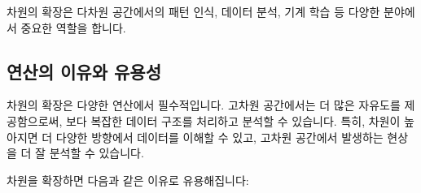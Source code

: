 \vspace{1\baselineskip}
\noindent 차원의 확장은 다차원 공간에서의 패턴 인식, 데이터 분석, 기계 학습 등 다양한 분야에서 중요한 역할을 합니다.

\subsection{연산의 이유와 유용성}
차원의 확장은 다양한 연산에서 필수적입니다. 고차원 공간에서는 더 많은 자유도를 제공함으로써, 보다 복잡한 데이터 구조를 처리하고 분석할 수 있습니다. 특히, 차원이 높아지면 더 다양한 방향에서 데이터를 이해할 수 있고, 고차원 공간에서 발생하는 현상을 더 잘 분석할 수 있습니다.

\vspace{1\baselineskip}
\noindent 차원을 확장하면 다음과 같은 이유로 유용해집니다:

